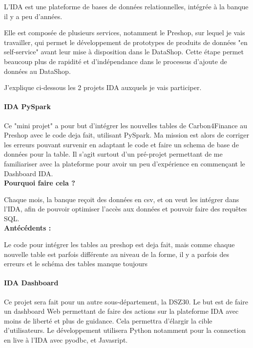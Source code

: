 L'IDA est une plateforme de bases de données relationnelles, intégrée à la banque il y a peu d'années. 

Elle est composée de plusieurs services, notamment le Preshop, sur lequel je vais travailler, qui permet le développement de prototypes de produits de données "en self-service" avant leur mise à disposition dans le DataShop.
Cette étape permet beaucoup plus de rapidité et d'indépendance dans le processus d'ajoute de données au DataShop.

J'explique ci-dessous les 2 projets IDA auxquels je vais participer.

\paragraph{IDA PySpark}

Ce "mini projet" a pour but d'intégrer les nouvelles tables de Carbon4Finance au Preshop avec le code deja fait, utilisant PySpark. 
Ma mission est alors de corriger les erreurs pouvant survenir en adaptant le code et faire un schema de base de données pour la table.
Il s'agit surtout d'un pré-projet permettant de me familiariser avec la plateforme pour avoir un peu d'expérience en commençant le Dashboard IDA.
\\

\textbf{Pourquoi faire cela ?}

Chaque mois, la banque reçoit des données en csv, et on veut les intégrer dans l'IDA, afin de pouvoir optimiser l’accès aux données et pouvoir faire des requêtes SQL.
\\

\textbf{Antécédents :}

Le code pour intégrer les tables au preshop est deja fait, mais comme chaque nouvelle table est parfois différente au niveau de la forme, il y a parfois des erreurs et le schéma des tables manque toujours

\paragraph{IDA Dashboard}

Ce projet sera fait pour un autre sous-département, la DSZ30.
Le but est de faire un dashboard Web permettant de faire des actions sur la plateforme IDA avec moins de liberté et plus de guidance.
Cela permettra d'élargir la cible d'utilisateurs.
Le développement utilisera Python notamment pour la connection en live à l'IDA avec pyodbc, et Javasript.
